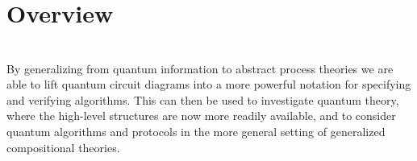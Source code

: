 \chapter{Overview}

\begin{align*}

\end{align*}

By generalizing from quantum information to abstract process theories we are able to lift quantum circuit diagrams into a more powerful notation for specifying and verifying algorithms.  This can then be used to investigate quantum theory, where the high-level structures are now more readily available, and to consider quantum algorithms and protocols in the more general setting of generalized compositional theories.
